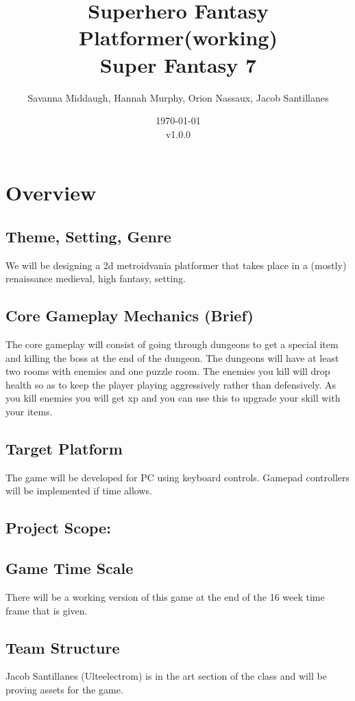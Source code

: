 \documentclass[titlepage]{article}
\title{Superhero Fantasy Platformer(working)\\
	\large Super Fantasy 7}
\author{Savanna Middaugh, Hannah Murphy, Orion Nassaux, Jacob Santillanes}
\date{\today\\v1.0.0}
\begin{document}
\maketitle
\section{Overview}

\subsection*{Theme, Setting, Genre}
We will be designing a 2d metroidvania platformer that takes place in a (mostly) renaissance medieval, high fantasy, setting. 

\subsection*{Core Gameplay Mechanics (Brief)}
The core gameplay will consist of going through dungeons to get a special item and killing the boss at the end of the dungeon. The dungeons will have at least two rooms with enemies and one puzzle room. The enemies you kill will drop health so as to keep the player playing aggressively rather than defensively. As you kill enemies you will get xp and you can use this to upgrade your skill with your items. 

\subsection*{Target Platform}
The game will be developed for PC using keyboard controls. Gamepad controllers will be implemented if time allows.

\subsection*{Project Scope:}

\subsection*{\normalsize Game Time Scale}
There will be a working version of this game at the end of the 16 week time frame that is given.

\subsection*{\normalsize Team Structure}
Jacob Santillanes (Ulteelectrom) is in the art section of the class and will be proving assets for the game.
\end{document}
